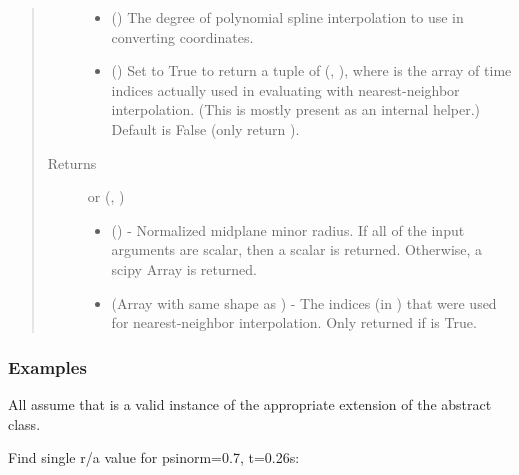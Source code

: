 \documentclass[letterpaper,10pt,english]{sphinxmanual}
\begin{document}
\begin{fulllineitems}
\begin{fulllineitems}
\begin{quote}
\begin{description}
\begin{itemize}
\item {} 
 () \textendash{} The degree of polynomial spline interpolation to
use in converting coordinates.

\item {} 
 () \textendash{} Set to True to return a tuple of (,
), where  is the array of time indices
actually used in evaluating  with nearest-neighbor
interpolation. (This is mostly present as an internal helper.)
Default is False (only return ).

\end{itemize}

\item[{Returns}] \leavevmode

 or (, )
\begin{itemize}
\item {} 
 () - Normalized midplane minor
radius. If all of the input arguments are scalar, then a scalar
is returned. Otherwise, a scipy Array is returned.

\item {} 
 (Array with same shape as ) - The indices
(in ) that were used for
nearest-neighbor interpolation. Only returned if  is
True.

\end{itemize}


\end{description}\end{quote}
\subsubsection*{Examples}

All assume that  is a valid instance of the appropriate
extension of the {\hyperref[\detokenize{eqtools:eqtools.core.Equilibrium}]{}} abstract class.

Find single r/a value for psinorm=0.7, t=0.26s:


\end{fulllineitems}
\end{fulllineitems}
\end{document}
